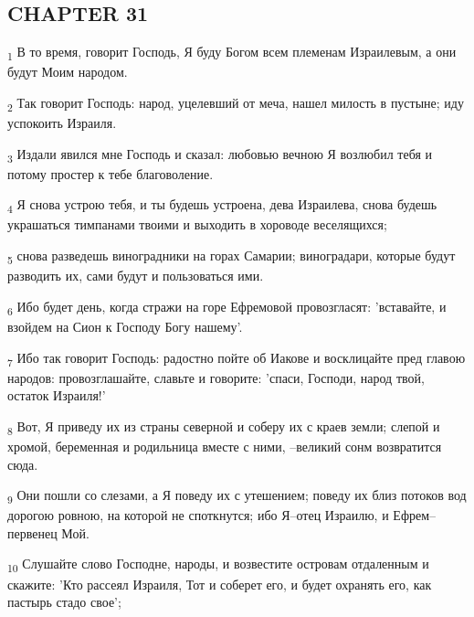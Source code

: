\subsection{CHAPTER 31}
\begin{tcolorbox}
\textsubscript{1} В то время, говорит Господь, Я буду Богом всем племенам Израилевым, а они будут Моим народом.
\end{tcolorbox}
\begin{tcolorbox}
\textsubscript{2} Так говорит Господь: народ, уцелевший от меча, нашел милость в пустыне; иду успокоить Израиля.
\end{tcolorbox}
\begin{tcolorbox}
\textsubscript{3} Издали явился мне Господь и сказал: любовью вечною Я возлюбил тебя и потому простер к тебе благоволение.
\end{tcolorbox}
\begin{tcolorbox}
\textsubscript{4} Я снова устрою тебя, и ты будешь устроена, дева Израилева, снова будешь украшаться тимпанами твоими и выходить в хороводе веселящихся;
\end{tcolorbox}
\begin{tcolorbox}
\textsubscript{5} снова разведешь виноградники на горах Самарии; виноградари, которые будут разводить их, сами будут и пользоваться ими.
\end{tcolorbox}
\begin{tcolorbox}
\textsubscript{6} Ибо будет день, когда стражи на горе Ефремовой провозгласят: 'вставайте, и взойдем на Сион к Господу Богу нашему'.
\end{tcolorbox}
\begin{tcolorbox}
\textsubscript{7} Ибо так говорит Господь: радостно пойте об Иакове и восклицайте пред главою народов: провозглашайте, славьте и говорите: 'спаси, Господи, народ твой, остаток Израиля!'
\end{tcolorbox}
\begin{tcolorbox}
\textsubscript{8} Вот, Я приведу их из страны северной и соберу их с краев земли; слепой и хромой, беременная и родильница вместе с ними, --великий сонм возвратится сюда.
\end{tcolorbox}
\begin{tcolorbox}
\textsubscript{9} Они пошли со слезами, а Я поведу их с утешением; поведу их близ потоков вод дорогою ровною, на которой не споткнутся; ибо Я--отец Израилю, и Ефрем--первенец Мой.
\end{tcolorbox}
\begin{tcolorbox}
\textsubscript{10} Слушайте слово Господне, народы, и возвестите островам отдаленным и скажите: 'Кто рассеял Израиля, Тот и соберет его, и будет охранять его, как пастырь стадо свое';
\end{tcolorbox}
